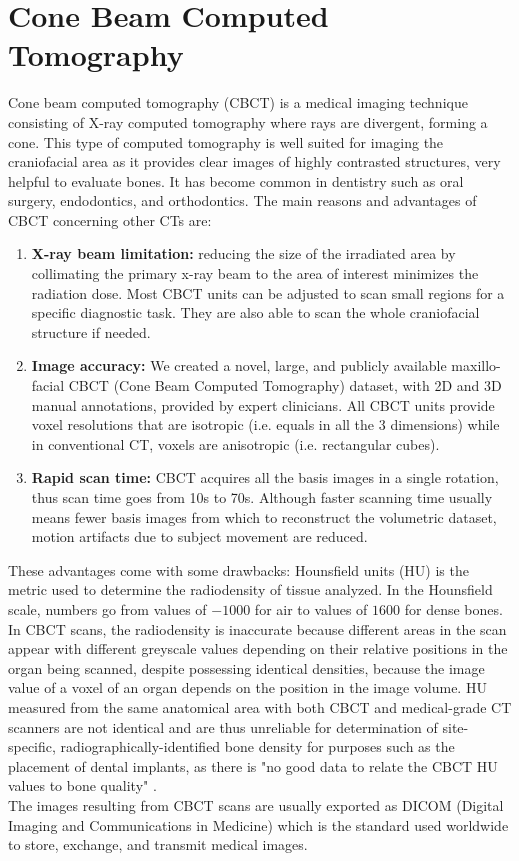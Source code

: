 \section{Cone Beam Computed Tomography}
Cone beam computed tomography (CBCT) is a medical imaging technique consisting
of X-ray computed tomography where rays are divergent, forming a cone. This type
of computed tomography is well suited for imaging the craniofacial area as it
provides clear images of highly contrasted structures, very helpful to evaluate
bones. It has become common in dentistry such as oral surgery, endodontics, and
orthodontics.
The main reasons and advantages of CBCT concerning other CTs are:
\begin{enumerate}
  \item{\textbf{X-ray beam limitation:} reducing the size of the irradiated area
  by collimating the primary x-ray beam to the area of interest minimizes the
  radiation dose. Most CBCT units can be adjusted to scan small regions for
  a specific diagnostic task. They are also able to scan the whole craniofacial
  structure if needed.}
  \item{\textbf{Image accuracy:} We created a novel, large, and publicly
  available maxillo-facial CBCT (Cone Beam Computed Tomography) dataset, with 2D
  and 3D manual annotations, provided by expert clinicians. All CBCT units
  provide voxel resolutions that are isotropic (i.e. equals in all the 3
  dimensions) while in conventional CT, voxels are anisotropic (i.e. rectangular
  cubes).}
  \item{\textbf{Rapid scan time:} CBCT acquires all the basis images in a single
  rotation, thus scan time goes from 10s to 70s. Although faster scanning time
  usually means fewer basis images from which to reconstruct the volumetric
  dataset, motion artifacts due to subject movement are reduced.}
\end{enumerate}
These advantages come with some drawbacks: Hounsfield units (HU) is the metric
used to determine the radiodensity of tissue analyzed. In the Hounsfield scale,
numbers go from values of $-1000$ for air to values of $1600$ for dense bones.
In CBCT scans, the radiodensity is inaccurate because different areas in the
scan appear with different greyscale values depending on their relative
positions in the organ being scanned, despite possessing identical densities,
because the image value of a voxel of an organ depends on the position in the
image volume. HU measured from the same anatomical area with both CBCT and
medical-grade CT scanners are not identical and are thus unreliable for
determination of site-specific, radiographically-identified bone density for
purposes such as the placement of dental implants, as there is "no good data to
relate the CBCT HU values to bone quality" \cite{Miles2007}.\\
The images resulting from CBCT scans are usually exported as DICOM (Digital
Imaging and Communications in Medicine) which is the standard used worldwide to
store, exchange, and transmit medical images.

